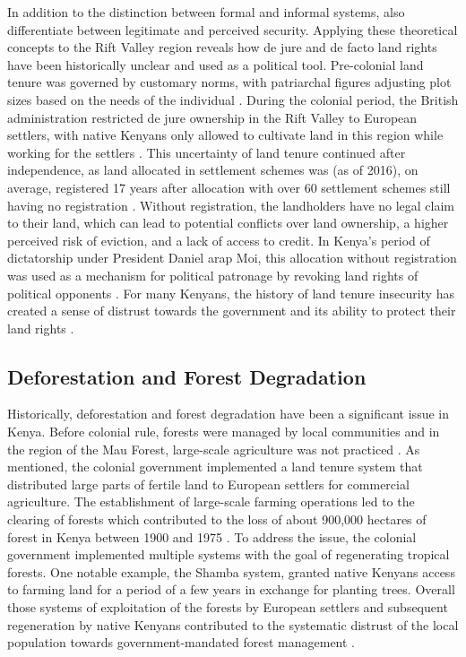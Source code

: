 In addition to the distinction between formal and informal systems, \cite{robinsonDoesSecureLand2014} also differentiate between legitimate and perceived security.
Applying these theoretical concepts to the Rift Valley region reveals how de jure and de facto land rights have been historically unclear and used as a political tool.
Pre-colonial land tenure was governed by customary norms, with patriarchal figures adjusting plot sizes based on the needs of the individual \parencite{leoLandClassKenya1984}.
During the colonial period, the British administration restricted de jure ownership in the Rift Valley to European settlers, with native Kenyans only allowed to cultivate land in this region while working for the settlers \parencite{leoLandClassKenya1984}.
This uncertainty of land tenure continued after independence, as land allocated in settlement schemes was (as of 2016), on average, registered 17 years after allocation with over 60 settlement schemes still having no registration \parencite{boonePromisedLandSettlement2021}.
Without registration, the landholders have no legal claim to their land, which can lead to potential conflicts over land ownership, a higher perceived risk of eviction, and a lack of access to credit.
In Kenya's period of dictatorship under President Daniel arap Moi, this allocation without registration was used as a mechanism for political patronage by revoking land rights of political opponents \parencite{booneLandConflictDistributive2012}.
For many Kenyans, the history of land tenure insecurity has created a sense of distrust towards the government and its ability to protect their land rights \parencite{placeEconomicEffectsLand1998}.

\subsection{Deforestation and Forest Degradation}
Historically, deforestation and forest degradation have been a significant issue in Kenya.
Before colonial rule, forests were managed by local communities and in the region of the Mau Forest, large-scale agriculture was not practiced \parencite{leoLandClassKenya1984}.
As mentioned, the colonial government implemented a land tenure system that distributed large parts of fertile land to European settlers for commercial agriculture.
The establishment of large-scale farming operations led to the clearing of forests which contributed to the loss of about 900,000 hectares of forest in Kenya between 1900 and 1975 \parencite{gitauColonialeraSettlementsPostcolonial2025}.
To address the issue, the colonial government implemented multiple systems with the goal of regenerating tropical forests.
One notable example, the Shamba system, granted native Kenyans access to farming land for a period of a few years in exchange for planting trees.
Overall those systems of exploitation of the forests by European settlers and subsequent regeneration by native Kenyans contributed to the systematic distrust of the local population towards government-mandated forest management \parencite{gitauColonialeraSettlementsPostcolonial2025}.


